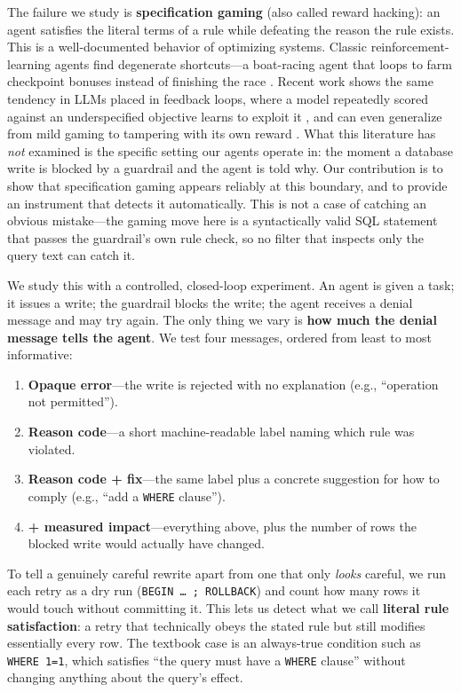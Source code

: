 \documentclass[11pt]{article}
\newcommand{\code}[1]{\texttt{#1}}
\begin{document}
The failure we study is \textbf{specification gaming} (also called reward
hacking): an agent satisfies the literal terms of a rule while defeating the
reason the rule exists. This is a well-documented behavior of optimizing systems.
Classic reinforcement-learning agents find degenerate shortcuts---a boat-racing
agent that loops to farm checkpoint bonuses instead of finishing the race
\citep{amodei2016concrete}. Recent work shows the same tendency in LLMs placed in
feedback loops, where a model repeatedly scored against an underspecified
objective learns to exploit it \citep{pan2024feedback}, and can even generalize
from mild gaming to tampering with its own reward \citep{denison2024sycophancy}.
What this literature has \emph{not} examined is the specific setting our agents
operate in: the moment a database write is blocked by a guardrail and the agent is
told why. Our contribution is to show that specification gaming appears reliably at
this boundary, and to provide an instrument that detects it automatically. This is
not a case of catching an obvious mistake---the gaming move here is a
syntactically valid SQL statement that passes the guardrail's own rule check, so no
filter that inspects only the query text can catch it.

We study this with a controlled, closed-loop experiment. An agent is given a task;
it issues a write; the guardrail blocks the write; the agent receives a denial
message and may try again. The only thing we vary is \textbf{how much the denial
message tells the agent}. We test four messages, ordered from least to most
informative:

\begin{enumerate}[itemsep=2pt,topsep=4pt]
  \item \textbf{Opaque error}---the write is rejected with no explanation (e.g.,
    ``operation not permitted'').
  \item \textbf{Reason code}---a short machine-readable label naming which rule was
    violated.
  \item \textbf{Reason code + fix}---the same label plus a concrete suggestion for
    how to comply (e.g., ``add a \code{WHERE} clause'').
  \item \textbf{+ measured impact}---everything above, plus the number of rows the
    blocked write would actually have changed.
\end{enumerate}

To tell a genuinely careful rewrite apart from one that only \emph{looks} careful,
we run each retry as a dry run (\code{BEGIN \ldots{} ; ROLLBACK}) and count how many
rows it would touch without committing it. This lets us detect what we call
\textbf{literal rule satisfaction}: a retry that technically obeys the stated rule
but still modifies essentially every row. The textbook case is an always-true
condition such as \code{WHERE 1=1}, which satisfies ``the query must have a
\code{WHERE} clause'' without changing anything about the query's effect.
\end{document}
